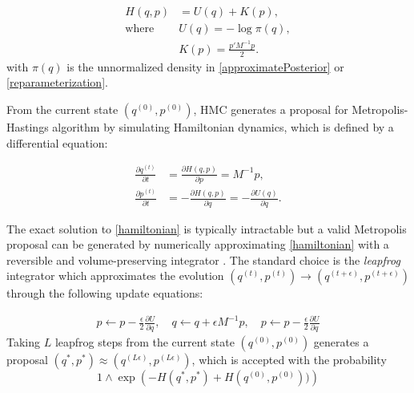 \documentclass[10pt,fleqn]{article}
\newcommand{\mc}[1]{\mathcal{#1}}
\DeclareMathOperator{\1}{\mathbbm{1}}
\newcommand{\dt}{\epsilon} %
\newcommand{\mass}{M} %
\begin{document}
\begin{equation}
\begin{aligned}
H(q, p)& = U(q)+K(p),\\
\text{where } & U(q) = -\log\pi(q),\\
& K(p) = \frac{p'\mass^{-1} p}{2}.
\end{aligned}
\end{equation}
with $\pi(q)$ is the unnormalized density in \eqref{approximatePosterior} or \eqref{reparameterization}. %

From the current state $(q^{(0)},p^{(0)})$, HMC generates a proposal for Metropolis-Hastings algorithm by simulating Hamiltonian dynamics, which is defined by a differential equation:

\begin{equation}
\begin{aligned}
\label{hamiltonian}
\frac{\partial q ^{(t)}}{\partial t} & =\frac{\partial H(q, p)}{\partial p} = \mass^{-1}p,\\
\frac{\partial p^{(t)}}{\partial t}& =-\frac{\partial H(q, p)}{\partial q} = -\frac{\partial U(q)}{\partial q}.
\end{aligned}
\end{equation}

The exact solution to \eqref{hamiltonian} is typically intractable but a valid Metropolis proposal can be generated by numerically approximating \eqref{hamiltonian} with a reversible and volume-preserving  integrator \citep{neal2011mcmc}. The standard choice is the \textit{leapfrog} integrator which approximates the evolution $(q^{(t)},p^{(t)}) \to (q^{(t + \dt)},p^{(t + \dt)})$ through the following update equations:

\begin{equation}
\begin{aligned}
\label{leap-frog}
p \leftarrow p - \frac{\dt}{2} \frac{\partial U}{\partial  q },\quad
q \leftarrow  q  + \dt \mass^{-1}p,\quad
p \leftarrow p -  \frac{\dt}{2}  \frac{\partial U}{\partial  q } 
\end{aligned}
\end{equation}
Taking $L$ leapfrog steps from the current state $(q^{(0)},p^{(0)})$ generates a proposal $(q^{*},p^{*}) \approx (q^{(L \dt)},p^{(L \dt)})$, which is accepted with the probability 
$$1\wedge \exp  \left( - H(q^{*},p^{*}) + H(q^{(0)},p^{(0)}))\right)$$
\end{document}
